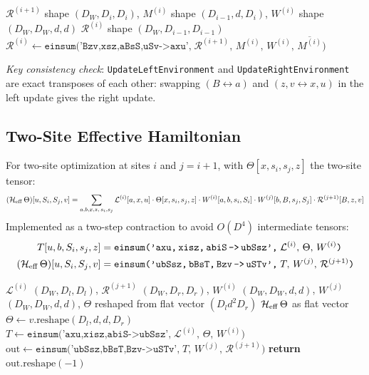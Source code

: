 \documentclass[aps,prb,onecolumn,scriptaddress]{revtex4-2}
\begin{document}
	\begin{algorithm}[H]
		\caption{UpdateRightEnvironment}
		\begin{algorithmic}[1]
			\Require $\mathcal{R}^{(i+1)}$ shape $(D_W, D_i, D_i)$,\;
			$M^{(i)}$ shape $(D_{i-1}, d, D_i)$,\;
			$W^{(i)}$ shape $(D_W, D_W, d, d)$
			\Ensure $\mathcal{R}^{(i)}$ shape $(D_W, D_{i-1}, D_{i-1})$
			\State $\mathcal{R}^{(i)} \gets
			\texttt{einsum('Bzv,xsz,aBsS,uSv->axu',}\;
			\mathcal{R}^{(i+1)},\, M^{(i)},\, W^{(i)},\, \overline{M^{(i)}}\texttt{)}$
		\end{algorithmic}
	\end{algorithm}
	
	\textit{Key consistency check}: \texttt{UpdateLeftEnvironment} and
	\texttt{UpdateRightEnvironment} are exact transposes of each other:
	swapping $(B\leftrightarrow a)$ and $(z,v\leftrightarrow x,u)$ in the
	left update gives the right update.
	
	\subsection{Two-Site Effective Hamiltonian}
	
	For two-site optimization at sites $i$ and $j=i+1$, with
	$\Theta[x, s_i, s_j, z]$ the two-site tensor:
	\begin{multline}
		(\mathcal{H}_{\rm eff}\,\Theta)[u, S_i, S_j, v]
		= \sum_{a, b, x, z,\, s_i, s_j}
		\mathcal{L}^{(i)}[a,x,u]\cdot
		\Theta[x, s_i, s_j, z]\cdot
		W^{(i)}[a, b, s_i, S_i]\cdot
		W^{(j)}[b, B, s_j, S_j]\cdot
		\mathcal{R}^{(j+1)}[B,z,v]
	\end{multline}
	Implemented as a two-step contraction to avoid $O(D^4)$ intermediate tensors:
	\begin{align}
		T[u, b, S_i, s_j, z]
		&= \texttt{einsum('axu,\,xisz,\,abiS\,->\,ubSsz',}\;
		\mathcal{L}^{(i)},\,\Theta,\, W^{(i)}\texttt{)}
		\label{eq:matvec_step1}\\
		(\mathcal{H}_{\rm eff}\,\Theta)[u, S_i, S_j, v]
		&= \texttt{einsum('ubSsz,\,bBsT,\,Bzv\,->\,uSTv',}\;
		T,\, W^{(j)},\, \mathcal{R}^{(j+1)}\texttt{)}
		\label{eq:matvec_step2}
	\end{align}
	
	\begin{algorithm}[H]
		\caption{TwoSiteMatvec}
		\begin{algorithmic}[1]
			\Require $\mathcal{L}^{(i)}$ $(D_W, D_l, D_l)$,\;
			$\mathcal{R}^{(j+1)}$ $(D_W, D_r, D_r)$,\;
			$W^{(i)}$ $(D_W, D_W, d, d)$,\;
			$W^{(j)}$ $(D_W, D_W, d, d)$,\;
			$\Theta$ reshaped from flat vector $(D_l d^2 D_r)$
			\Ensure $\mathcal{H}_{\rm eff}\,\Theta$ as flat vector
			\State $\Theta \gets v.\text{reshape}(D_l, d, d, D_r)$
			\State $T \gets \texttt{einsum('axu,xisz,abiS->ubSsz',}\;
			\mathcal{L}^{(i)},\,\Theta,\,W^{(i)}\texttt{)}$
			\State $\text{out} \gets \texttt{einsum('ubSsz,bBsT,Bzv->uSTv',}\;
			T,\,W^{(j)},\,\mathcal{R}^{(j+1)}\texttt{)}$
			\State \textbf{return} $\text{out}.\text{reshape}(-1)$
		\end{algorithmic}
	\end{algorithm}
	
\end{document}
